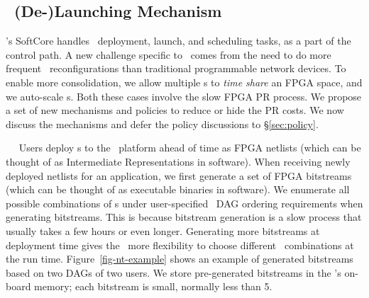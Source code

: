 \subsection{\nt\ (De-)Launching Mechanism}
\label{sec:ntsched}
\snic's SoftCore handles \nt\ deployment, launch, and scheduling tasks, as a part of the control path.
A new challenge specific to \snic\ comes from the need to do more frequent \nt\ reconfigurations than traditional programmable network devices.
To enable more consolidation, we allow multiple \nt{}s to {\em time share} an FPGA space, and we auto-scale \nt{}s.
Both these cases involve the slow FPGA PR process.
We propose a set of new mechanisms and policies to reduce or hide the PR costs.
We now discuss the mechanisms and defer the policy discussions to \S\ref{sec:policy}.

~~
Users deploy \nt{}s to the \snic\ platform ahead of time as FPGA netlists (which can be thought of as Intermediate Representations in software).
When receiving newly deployed \nt{} netlists for an application, we first generate a set of FPGA bitstreams (which can be thought of as executable binaries in software).
We enumerate all possible combinations of \nt{}s under user-specified \nt\ DAG ordering requirements when generating bitstreams. 
This is because bitstream generation is a slow process that usually takes a few hours or even longer. 
Generating more bitstreams at deployment time gives the \snic\ more flexibility to choose different \nt\ combinations at the run time. 
Figure~\ref{fig-nt-example} shows an example of generated bitstreams based on two DAGs of two users.
We store pre-generated bitstreams in the \snic{}'s on-board memory; each bitstream is small, normally less than 5\MB.

